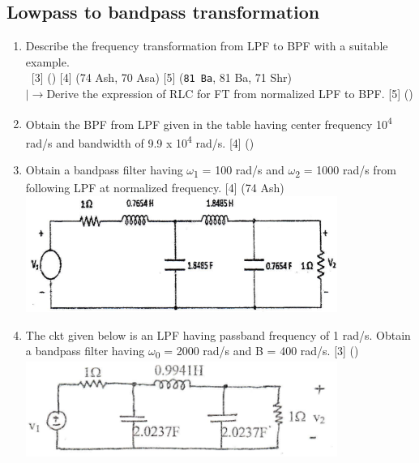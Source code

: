 \documentclass[12pt]{article}
\newcommand{\w}{\(\omega\)}
\newcommand{\lb}{\\$\left|\rightarrow\right.$}
\newcommand{\enter}{\\\textcolor{white}{1}}
\newcommand{\sub}[1]{\textsubscript{#1}}
\begin{document}
	\subsection{Lowpass to bandpass transformation}
		\begin{enumerate}
			\item Describe the frequency transformation from LPF to BPF with a suitable example.
			\enter \hfill [3] () [4] (74 Ash, 70 Asa) [5] (\texttt{81 Ba}, 81 Ba, 71 Shr)
			\lb Derive the expression of RLC for FT from normalized LPF to BPF. \hfill [5] ()
			
			\item Obtain the BPF from LPF given in the table having center frequency 10\textsuperscript{4} rad/s and bandwidth of 9.9 x 10\textsuperscript{4} rad/s. \hfill[4] ()
			
			\item Obtain a bandpass filter having \w\sub{1} = 100 rad/s and \w\sub{2} = 1000 rad/s from following LPF at normalized frequency. \hfill [4] (74 Ash)\\
			\includegraphics[width=4in]{fd_8}
			
			\item The ckt given below is an LPF having passband frequency of 1 rad/s. Obtain a bandpass filter having \w\sub{0} = 2000 rad/s and B = 400 rad/s. \hfill [3] ()\\
			\includegraphics[width=4in]{fd_10}
		\end{enumerate}
\end{document}
